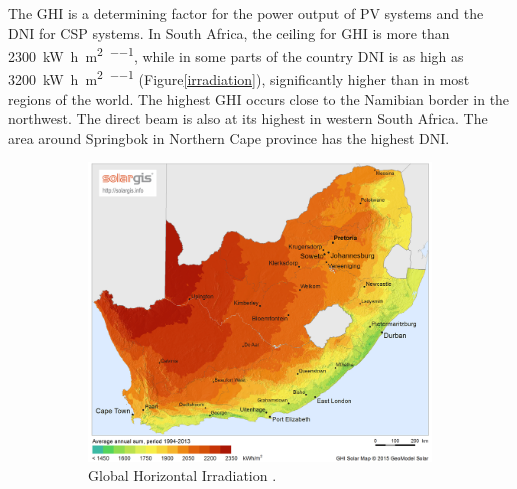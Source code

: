The GHI is a determining factor for the power output of PV systems and the DNI for CSP systems. In South Africa, the ceiling for GHI is more than \SI{2300}{\kilo\watt\hour\per\square\metre\per\year}, while in some parts of the country DNI is as high as \SI{3200}{\kilo\watt\hour\per\square\metre\per\year} (Figure\ref{irradiation}), significantly higher than in most regions of the world. The highest GHI occurs close to the Namibian border in the northwest. The direct beam is also at its highest in western South Africa. The area around Springbok in Northern Cape province has the highest DNI.

\begin{figure}[h!]
        \centering
        \begin{subfigure}[b]{0.5\textwidth}
                \centering
                \includegraphics[width=1\textwidth]{FIG/SA_GHI}
                \caption{Global Horizontal Irradiation \cite{SolarGIS2015a}.}\label{fig:bild-links}
        \end{subfigure}%
        ~
        \begin{subfigure}[b]{0.5\textwidth}
                \centering

\end{subfigure}
\end{figure}
